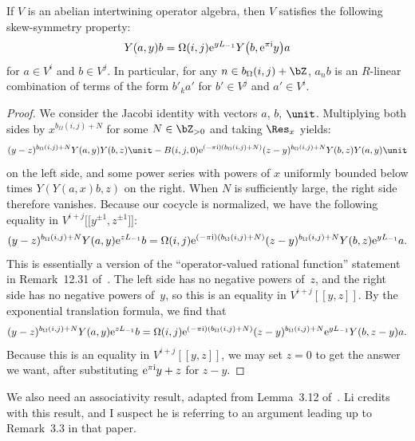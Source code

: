 \begin{lem} \label{lem:skew-symmetry-for-AIA}If $V$ is an abelian intertwining operator algebra, then $V$ satisfies the following skew-symmetry property:
\begin{gather*} Y(a,y)b = \Omega(i,j){\rm e}^{yL_{-1}}Y\big(b,{\rm e}^{\pi {\rm i}}y\big)a \end{gather*}
for $a \in V^i$ and $b \in V^j$. In particular, for any $n \in b_\Omega(i,j) + \bZ$, $a_n b$ is an $R$-linear combination of terms of the form $b'_k a'$ for $b' \in V^j$ and $a' \in V^i$.
\end{lem}
\begin{proof}We consider the Jacobi identity with vectors $a$, $b$, $\unit$. Multiplying both sides by $x^{b_\Omega(i,j)+N}$ for some $N \in \bZ_{>0}$ and taking $\Res_x$ yields:
\begin{gather*} (y-z)^{b_\Omega(i,j)+N}Y(a,y) Y(b,z) \unit - B(i,j,0) {\rm e}^{(-\pi {\rm i})(b_\Omega(i,j)+N)}(z-y)^{b_\Omega(i,j)+N} Y(b,z) Y(a,y) \unit \end{gather*}
on the left side, and some power series with powers of $x$ uniformly bounded below times $Y(Y(a,x)b,z)$ on the right. When $N$ is sufficiently large, the right side therefore vanishes. Because our cocycle is normalized, we have the following equality in $V^{i+j}\big[\big[y^{\pm 1},z^{\pm 1}\big]\big]$:
\begin{gather*} (y-z)^{b_\Omega(i,j)+N}Y(a,y) {\rm e}^{zL_{-1}}b = \Omega(i,j) {\rm e}^{(-\pi {\rm i})(b_\Omega(i,j)+N)}(z-y)^{b_\Omega(i,j)+N} Y(b,z) {\rm e}^{yL_{-1}}a. \end{gather*}
This is essentially a version of the ``operator-valued rational function'' statement in Remark~12.31 of~\cite{DL93}. The left side has no negative powers of~$z$, and the right side has no negative powers of~$y$, so this is an equality in $V^{i+j}[[y,z]]$. By the exponential translation formula, we find that
\begin{gather*} (y-z)^{b_\Omega(i,j)+N}Y(a,y) {\rm e}^{zL_{-1}}b = \Omega(i,j) {\rm e}^{(-\pi {\rm i})(b_\Omega(i,j)+N)}(z-y)^{b_\Omega(i,j)+N} {\rm e}^{yL_{-1}} Y(b,z-y) a. \end{gather*}
Because this is an equality in $V^{i+j}[[y,z]]$, we may set $z=0$ to get the answer we want, after substituting ${\rm e}^{\pi {\rm i}}y + z$ for $z-y$.
\end{proof}

We also need an associativity result, adapted from Lemma~3.12 of~\cite{L99}. Li credits~\cite{DLM96} with this result, and I suspect he is referring to an argument leading up to Remark~3.3 in that paper.

